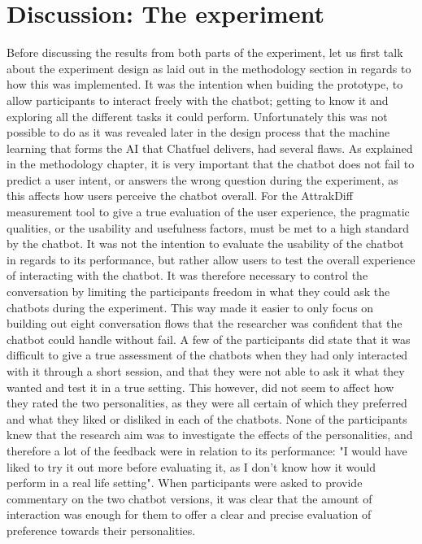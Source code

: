\section{Discussion: The experiment}
Before discussing the results from both parts of the experiment, let us first talk about the experiment design as laid out in the methodology section in regards to how this was implemented. It was the intention when buiding the prototype, to allow participants to interact freely with the chatbot; getting to know it and exploring all the different tasks it could perform. Unfortunately this was not possible to do as it was revealed later in the design process that the machine learning that forms the AI that Chatfuel delivers, had several flaws. As explained in the methodology chapter, it is very important that the chatbot does not fail to predict a user intent, or answers the wrong question during the experiment, as this affects how users perceive the chatbot overall. For the AttrakDiff measurement tool to give a true evaluation of the user experience, the pragmatic qualities, or the usability and usefulness factors, must be met to a high standard by the chatbot. It was not the intention to evaluate the usability of the chatbot in regards to its performance, but rather allow users to test the overall experience of interacting with the chatbot. It was therefore necessary to control the conversation by limiting the participants freedom in what they could ask the chatbots during the experiment. This way made it easier to only focus on building out eight conversation flows that the researcher was confident that the chatbot could handle without fail. A few of the participants did state that it was difficult to give a true assessment of the chatbots when they had only interacted with it through a short session, and that they were not able to ask it what they wanted and test it in a true setting. This however, did not seem to affect how they rated the two personalities, as they were all certain of which they preferred and what they liked or disliked in each of the chatbots. None of the participants knew that the research aim was to investigate the effects of the personalities, and therefore a lot of the feedback were in relation to its performance: "I would have liked to try it out more before evaluating it, as I don't know how it would perform in a real life setting". When participants were asked to provide commentary on the two chatbot versions, it was clear that the amount of interaction was enough for them to offer a clear and precise evaluation of preference towards their personalities. 

